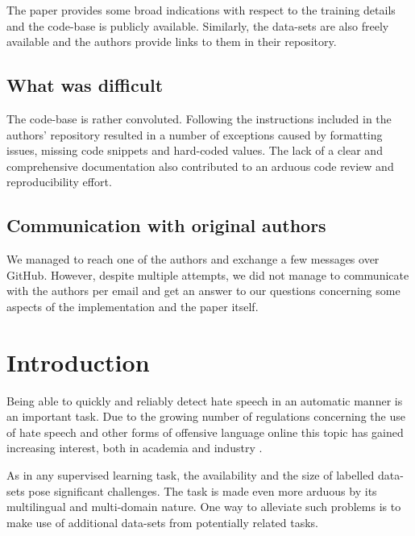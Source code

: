 The paper provides some broad indications with respect to the training details and the code-base is publicly available. Similarly, the data-sets are also freely available and the authors provide links to them in their repository.


\subsection{What was difficult}

The code-base is rather convoluted. Following the instructions included in the authors' repository resulted in a number of exceptions caused by formatting issues, missing code snippets and hard-coded values. The lack of a clear and comprehensive documentation also contributed to an arduous code review and reproducibility effort.


\subsection{Communication with original authors}

We managed to reach one of the authors and exchange a few messages over GitHub. However, despite multiple attempts, we did not manage to communicate with the authors per email and get an answer to our questions concerning some aspects of the implementation and the paper itself.

\newpage



\section{Introduction}

Being able to quickly and reliably detect hate speech in an automatic manner is an important task.
Due to the growing number of regulations concerning the use of hate speech and other forms of offensive language online this topic has gained increasing interest, both in academia and industry \cite{davidson_2017, Schmidt_2017, basile_semeval, yin_arkaitz}.

As in any supervised learning task, the availability and the size of labelled data-sets pose significant challenges. The task is made even more arduous by its multilingual and multi-domain nature. One way to alleviate such problems is to make use of additional data-sets from potentially related tasks.

